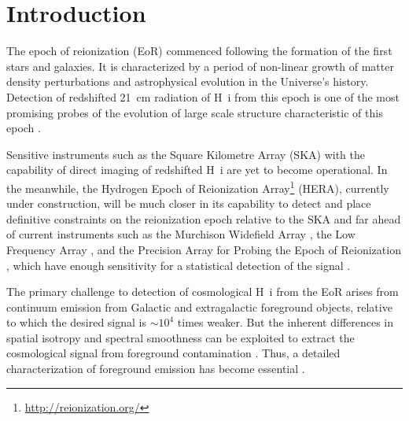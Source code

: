 \documentclass[preprint2,apjl,numberedappendix,twocolappendix,appendixfloats]{emulateapj}
\begin{document}

\section{Introduction}\label{sec:intro}

The epoch of reionization (EoR) commenced following the formation of the first stars and galaxies. It is characterized by a period of non-linear growth of matter density perturbations and astrophysical evolution in the Universe's history. Detection of redshifted 21~cm radiation of H~{\sc i} from this epoch is one of the most promising probes of the evolution of large scale structure characteristic of this epoch \citep{sun72,sco90,mad97,toz00,ili02}.

Sensitive instruments such as the Square Kilometre Array (SKA) with the capability of direct imaging of redshifted H~{\sc i} are yet to become operational. In the meanwhile, the Hydrogen Epoch of Reionization Array\footnote{\url{http://reionization.org/}} (HERA), currently under construction, will be much closer in its capability to detect and place definitive constraints on the reionization epoch relative to the SKA and far ahead of current instruments such as the Murchison Widefield Array \citep[MWA;][]{lon09,tin13,bow13}, the Low Frequency Array \citep[LOFAR;][]{van13}, and the Precision Array for Probing the Epoch of Reionization \citep[PAPER;][]{par10}, which have enough sensitivity for a statistical detection of the signal \citep{bow06,par12a,bea13,dil13,thy13,pob14}.


The primary challenge to detection of cosmological H~{\sc i} from the EoR arises from continuum emission from Galactic and extragalactic foreground objects, relative to which the desired signal is $\sim 10^4$ times weaker. But the inherent differences in spatial isotropy and spectral smoothness can be exploited to extract the cosmological signal from foreground contamination \citep[see, e.g.,][]{dim02,dim04,zal04,fur04,mor04,san05,fur06,mcq06,mor06,wan06,gle08}. Thus, a detailed characterization of foreground emission has become essential \citep{ali08,bow09,liu09,ber09,ber10,dat10,liu11,gho12,mor12,par12b,tro12,pob13,dil13,dil14,liu14a,liu14b,thy13,thy15}.
\end{document}
